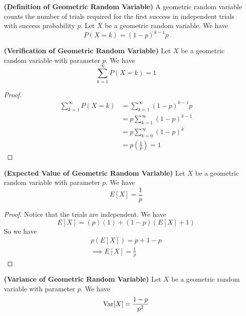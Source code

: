 \documentclass{report}
\begin{document}
\begin{definition}
\label{1.1.19}
\textbf{(Definition of Geometric Random Variable)} A geometric random variable counts the number of trials required for the first success in independent trials with success probability $p$. Let  $X$ be a geometric random variable. We have
\begin{equation}
P(X=k)=(1-p)^{k-1}p
\end{equation}
\end{definition}
\begin{theorem}
\label{1.1.20}
\textbf{(Verification of Geometric Random Variable)} Let $X$ be a geometric random variable with parameter $p$. We have
\begin{equation}
\sum_{k=1}^\infty P(X=k)=1
\end{equation}
\end{theorem}
\begin{proof}
\begin{align}
\sum_{k=1}^\infty P(X=k)&=\sum_{k=1}^\infty (1-p)^{k-1}p\\
&=p\sum_{k=1}^\infty (1-p)^{k-1}\\
&=p\sum_{k=0}^\infty (1-p)^k\\
&=p(\frac{1}{p})=1
\end{align}
\end{proof}
\begin{theorem}
\label{1.1.21}
\textbf{(Expected Value of Geometric Random Variable)} Let $X$ be a geometric random variable with parameter $p$. We have
 \begin{equation}
E[X]=\frac{1}{p}
\end{equation}
\end{theorem}
\begin{proof}
  Notice that the trials are independent. We have
  \begin{equation}
  E[X]=(p)(1)+(1-p)(E[X]+1)
  \end{equation}
  So we have
  \begin{gather}
 p(E[X])=p+1-p\\
 \implies E[X]=\frac{1}{p} 
  \end{gather}
\end{proof}
\begin{theorem}
\label{1.1.22}
\textbf{(Variance of Geometric Random Variable)} Let $X$ be a geometric random variable with parameter $p$. We have
\begin{equation}
\text{Var} [X]=\frac{1-p}{p^2}
\end{equation}
\end{theorem}
\end{document}
